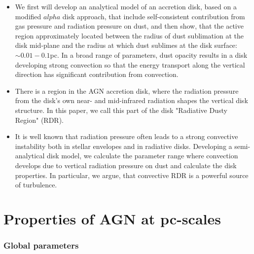 \documentclass[12pt,english,preprint]{aastex}
\newcommand{\mdt}[1][]{ 
  \ifthenelse{\isempty{#1}}
  {\dot{M}_{\rm loc}}
  { {\dot M}_{\rm{loc},{#1}} } 
  } %
\begin{document}
\begin{itemize}
    \item  We first will develop an analytical model of an accretion disk, based on a modified 
    $alpha$ disk approach, that include self-consistent contribution from gas pressure 
    and radiation pressure on dust, and then show, that the active region approximately located 
    between the radius of dust sublimation at the disk mid-plane and the radius at which dust 
    sublimes at the disk surface: $\sim 0.01-0.1$pc. In a broad range of parameters, dust opacity results in a disk developing 
    strong convection so that the energy transport along the vertical direction has significant
    contribution from convection. 

    \item There is a region in the AGN accretion disk, where the radiation pressure from the disk's own near- and mid-infrared 
    radiation shapes the vertical disk structure. In this paper, we call this part of the disk "Radiative Dusty Region" (RDR).
    \item It is well known that radiation pressure often leads to a strong convective instability both in stellar envelopes 
    and in radiative disks.   Developing a semi-analytical disk model,
    we calculate the parameter range where convection develops due to vertical radiation pressure on dust and calculate 
    the disk properties. In particular, we argue, that convective RDR is a powerful source of turbulence.


\end{itemize}




\section{Properties of AGN at pc-scales}

\subsubsection{Global parameters }
\end{document}
